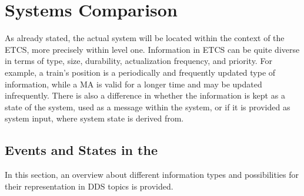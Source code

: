 \chapter{Systems Comparison}
\label{chptr:redundantSystemsCompare}

As already stated, the actual system will be located within the context of the \gls*{ETCS}, more precisely within  level one.
Information in \gls*{ETCS} can be quite diverse in terms of type, size, durability, actualization frequency, and priority.
For example, a train's position is a periodically and frequently updated type of information, while a \gls*{MA} is valid for a longer time and may be updated infrequently.
There is also a difference in whether the information is kept as a state of the system, used as a message within the system, or if it is provided as system input, where system state is derived from.

\section{Events and States in the }
In this section, an overview about different information types and possibilities for their representation in \gls*{DDS} topics is provided.

